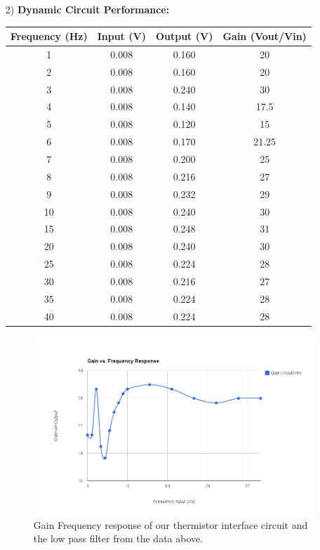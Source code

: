 \documentclass{article}
\begin{document}
\begin{enumerate}
		\item[2)] %
			\textbf{Dynamic Circuit Performance: }\\
			\begin{table}[h]
				\centering
				\begin{tabular}{|c|c|c|c|}\hline
					Frequency (Hz)	&	Input (V)	&	Output (V)	&	Gain (Vout/Vin)\\ \hline
					1	&	0.008	&	0.160	&	20\\ \hline
					2	&	0.008	&	0.160	&	20\\ \hline
					3	&	0.008	&	0.240	&	30\\ \hline
					4	&	0.008	&	0.140	&	17.5\\ \hline
					5	&	0.008	&	0.120	&	15\\ \hline
					6	&	0.008	&	0.170	&	21.25\\ \hline
					7	&	0.008	&	0.200	&	25\\ \hline
					8	&	0.008	&	0.216	&	27\\ \hline
					9	&	0.008	&	0.232	&	29\\ \hline
					10	&	0.008	&	0.240	&	30\\ \hline
					15	&	0.008	&	0.248	&	31\\ \hline
					20	&	0.008	&	0.240	&	30\\ \hline
					25	&	0.008	&	0.224	&	28\\ \hline
					30	&	0.008	&	0.216	&	27\\ \hline
					35	&	0.008	&	0.224	&	28\\ \hline
					40	&	0.008	&	0.224	&	28\\ \hline
				
				\end{tabular}
			\end{table}
			
			\begin{figure}[h]
				\centering
				\includegraphics[keepaspectratio, width = \textwidth]{Lab9Graphics/GainFrequencyResponse.png}
				\caption{Gain Frequency response of our thermistor interface circuit and the low pass filter from the data above.}
			\end{figure}
			\pagebreak
			

\end{enumerate}
\end{document}
